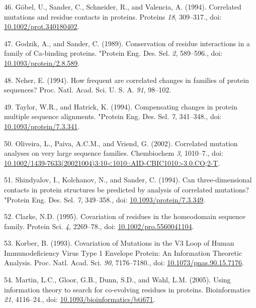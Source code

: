 \documentclass[11pt,a4paper,twoside]{book}
\theoremstyle{definition}
\theoremstyle{definition}
\theoremstyle{remark}
\begin{document}
\hypertarget{ref-Gobel1994}{}
46. Göbel, U., Sander, C., Schneider, R., and Valencia, A. (1994).
Correlated mutations and residue contacts in proteins. Proteins
\emph{18}, 309--317., doi:
\href{https://doi.org/10.1002/prot.340180402}{10.1002/prot.340180402}.

\hypertarget{ref-Godzik1989}{}
47. Godzik, A., and Sander, C. (1989). Conservation of residue
interactions in a family of Ca-binding proteins. "Protein Eng. Des. Sel.
\emph{2}, 589--596., doi:
\href{https://doi.org/10.1093/protein/2.8.589}{10.1093/protein/2.8.589}.

\hypertarget{ref-Neher1994}{}
48. Neher, E. (1994). How frequent are correlated changes in families of
protein sequences? Proc. Natl. Acad. Sci. U. S. A. \emph{91}, 98--102.

\hypertarget{ref-Taylor1994}{}
49. Taylor, W.R., and Hatrick, K. (1994). Compensating changes in
protein multiple sequence alignments. "Protein Eng. Des. Sel. \emph{7},
341--348., doi:
\href{https://doi.org/10.1093/protein/7.3.341}{10.1093/protein/7.3.341}.

\hypertarget{ref-Oliveira2002}{}
50. Oliveira, L., Paiva, A.C.M., and Vriend, G. (2002). Correlated
mutation analyses on very large sequence families. Chembiochem \emph{3},
1010--7., doi:
\href{https://doi.org/10.1002/1439-7633(20021004)3:10\%3C1010::AID-CBIC1010\%3E3.0.CO;2-T}{10.1002/1439-7633(20021004)3:10\textless{}1010::AID-CBIC1010\textgreater{}3.0.CO;2-T}.

\hypertarget{ref-Shindyalov1994}{}
51. Shindyalov, I., Kolchanov, N., and Sander, C. (1994). Can
three-dimensional contacts in protein structures be predicted by
analysis of correlated mutations? "Protein Eng. Des. Sel. \emph{7},
349--358., doi:
\href{https://doi.org/10.1093/protein/7.3.349}{10.1093/protein/7.3.349}.

\hypertarget{ref-Clarke1995}{}
52. Clarke, N.D. (1995). Covariation of residues in the homeodomain
sequence family. Protein Sci. \emph{4}, 2269--78., doi:
\href{https://doi.org/10.1002/pro.5560041104}{10.1002/pro.5560041104}.

\hypertarget{ref-Korber1993}{}
53. Korber, B. (1993). Covariation of Mutations in the V3 Loop of Human
Immunodeficiency Virus Type 1 Envelope Protein: An Information Theoretic
Analysis. Proc. Natl. Acad. Sci. \emph{90}, 7176--7180., doi:
\href{https://doi.org/10.1073/pnas.90.15.7176}{10.1073/pnas.90.15.7176}.

\hypertarget{ref-Martin2005}{}
54. Martin, L.C., Gloor, G.B., Dunn, S.D., and Wahl, L.M. (2005). Using
information theory to search for co-evolving residues in proteins.
Bioinformatics \emph{21}, 4116--24., doi:
\href{https://doi.org/10.1093/bioinformatics/bti671}{10.1093/bioinformatics/bti671}.
\end{document}
